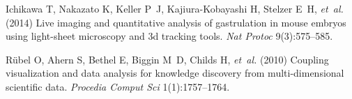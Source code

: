 \documentclass{pnastwo}
\begin{document}
\begin{article}
\begin{thebibliography}{10}
Ichikawa T, Nakazato K, Keller P~J, Kajiura-Kobayashi H, Stelzer E~H,
  \textit{et~al.} (2014) Live imaging and quantitative analysis of gastrulation
  in mouse embryos using light-sheet microscopy and 3d tracking tools.
  \textit{Nat Protoc} 9(3):575--585.

R{\"u}bel O, Ahern S, Bethel E, Biggin M~D, Childs H, \textit{et~al.} (2010)
  Coupling visualization and data analysis for knowledge discovery from
  multi-dimensional scientific data. \textit{Procedia Comput Sci}
  1(1):1757--1764.

\end{thebibliography}



\end{article}
\end{document}
